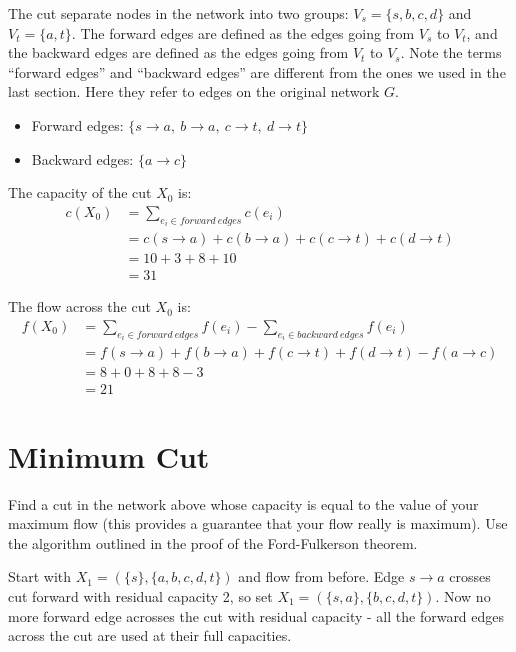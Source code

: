 \documentclass{article}
\begin{document}
The cut separate nodes in the network into two groups:
$V_s = \{s, b, c, d\}$ and $V_t = \{a, t\}$. The forward edges are defined
as the edges going from $V_s$ to $V_t$, and the backward edges are defined
as the edges going from $V_t$ to $V_s$. Note the terms ``forward edges''
and ``backward edges'' are different from the ones we used in the last section.
Here they refer to edges on the original network $G$.
\begin{itemize}
\item Forward edges: $\{s \rightarrow a,~ b \rightarrow a,~ c \rightarrow t,~
d\rightarrow t\}$
\item Backward edges: $\{a \rightarrow c\}$
\end{itemize}

The capacity of the cut $X_0$ is:
\begin{equation}
	\begin{split}
		c(X_0) &= \sum_{e_i \in forward~edges} c(e_i)\\
		&=c(s \rightarrow a) + c(b \rightarrow a) + 
		c(c \rightarrow t) + c(d\rightarrow t)\\
		&= 10 + 3 + 8 + 10 \\
		&= 31
	\end{split}
\end{equation}

The flow across the cut $X_0$ is:
\begin{equation}
	\begin{split}
		f(X_0) &= \sum_{e_i \in forward~edges} f(e_i)
		- \sum_{e_i \in backward~edges} f(e_i)\\
		&= f(s \rightarrow a) + f(b \rightarrow a) + 
		f(c \rightarrow t) + f(d\rightarrow t) - f(a \rightarrow c)\\
		&= 8+0+8+8-3\\
		&= 21
	\end{split}
\end{equation}

\section{Minimum Cut}
Find a cut in the network above whose capacity is equal to the value
of your maximum flow (this provides a guarantee that your flow really
is maximum). Use the algorithm outlined in the proof of the
Ford-Fulkerson theorem.

Start with $X_1 = (\{s\}, \{a,b,c,d,t\})$ and flow from before.
Edge $s \rightarrow a$ crosses cut forward with residual capacity 2, so set
$X_1 = (\{s,a\}, \{b,c,d,t\})$. Now no more forward edge acrosses the cut 
with residual capacity - all the forward edges across the cut are used at
their full capacities.
\end{document}
